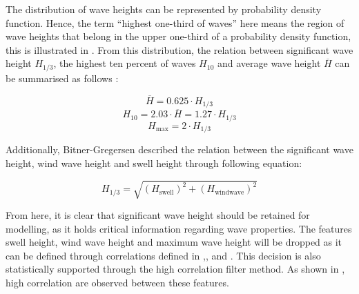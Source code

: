 The distribution of wave heights can be represented by probability density function. Hence, the term ``highest one-third of waves'' here means the region of wave heights that belong in the upper one-third of a probability density function, this is illustrated in . From this distribution, the relation between significant wave height $H_{1/3}$, the highest ten percent of waves $H_{10}$ and average wave height $\overline{H}$ can be summarised as follows \cite{bretschneider.1965,Holthuijsen.2007}: 

\begin{equation}\label{eqn:Hsig_mean}
    \overline{H} = 0.625\cdot H_{1/3}
\end{equation}
\begin{equation}\label{eqn:Hsig_Hten}
    H_{10} = 2.03\cdot \overline{H} = 1.27\cdot H_{1/3} 
\end{equation}
\begin{equation}\label{eqn:Hsig_max}
    H_{\text{max}} = 2 \cdot H_{1/3} 
\end{equation} 

Additionally, Bitner-Gregersen \cite{BitnerGregersen.2005} described the relation between the significant wave height, wind wave height and swell height through following equation:

\begin{equation}\label{eqn:H_sig_root}
    H_{1/3} = \sqrt{(H_{\text{swell}})^2 + (H_{\text{windwave}})^2} 
\end{equation}

From here, it is clear that significant wave height should be retained for modelling, as it holds critical information regarding wave properties. The features swell height, wind wave height and maximum wave height will be dropped as it can be defined through correlations defined in ,, and . This decision is also statistically supported through the high correlation filter method. As shown in , high correlation are observed between these features.\\

